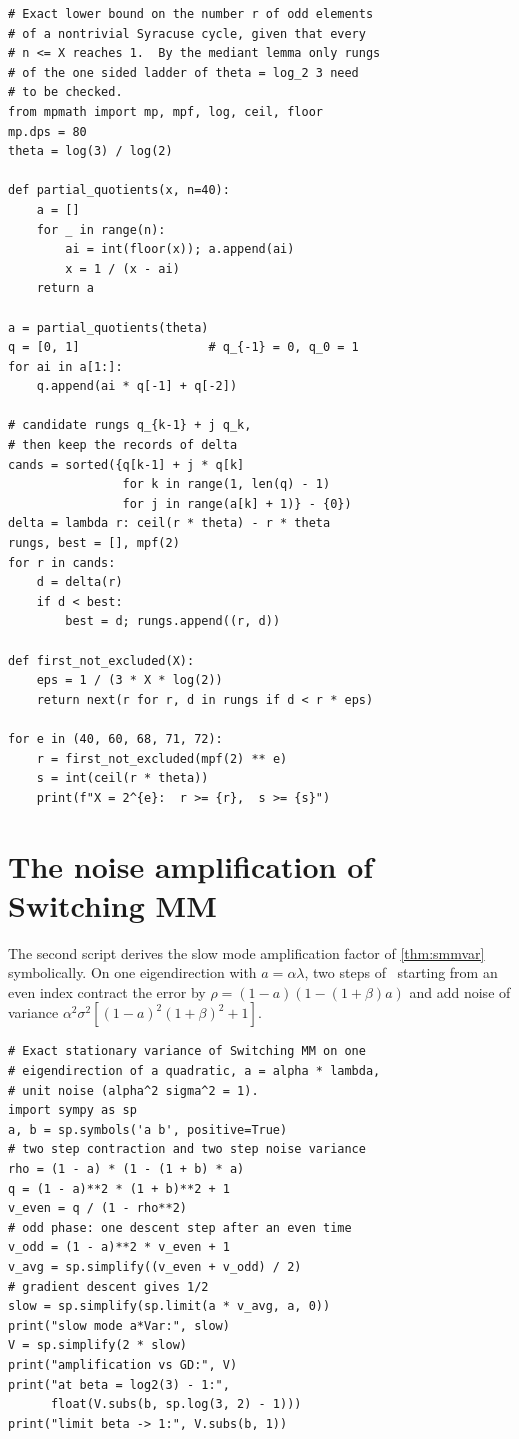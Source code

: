 \begin{lstlisting}
# Exact lower bound on the number r of odd elements
# of a nontrivial Syracuse cycle, given that every
# n <= X reaches 1.  By the mediant lemma only rungs
# of the one sided ladder of theta = log_2 3 need
# to be checked.
from mpmath import mp, mpf, log, ceil, floor
mp.dps = 80
theta = log(3) / log(2)

def partial_quotients(x, n=40):
    a = []
    for _ in range(n):
        ai = int(floor(x)); a.append(ai)
        x = 1 / (x - ai)
    return a

a = partial_quotients(theta)
q = [0, 1]                  # q_{-1} = 0, q_0 = 1
for ai in a[1:]:
    q.append(ai * q[-1] + q[-2])

# candidate rungs q_{k-1} + j q_k,
# then keep the records of delta
cands = sorted({q[k-1] + j * q[k]
                for k in range(1, len(q) - 1)
                for j in range(a[k] + 1)} - {0})
delta = lambda r: ceil(r * theta) - r * theta
rungs, best = [], mpf(2)
for r in cands:
    d = delta(r)
    if d < best:
        best = d; rungs.append((r, d))

def first_not_excluded(X):
    eps = 1 / (3 * X * log(2))
    return next(r for r, d in rungs if d < r * eps)

for e in (40, 60, 68, 71, 72):
    r = first_not_excluded(mpf(2) ** e)
    s = int(ceil(r * theta))
    print(f"X = 2^{e}:  r >= {r},  s >= {s}")
\end{lstlisting}

\section{The noise amplification of Switching MM}

The second script derives the slow mode amplification factor of
\cref{thm:smmvar} symbolically. On one eigendirection with $a=\alpha\lambda$,
two steps of \smmdet\ starting from an even index contract the error by
$\rho=(1-a)(1-(1+\beta)a)$ and add noise of variance
$\alpha^2\sigma^2[(1-a)^2(1+\beta)^2+1]$.

\begin{lstlisting}
# Exact stationary variance of Switching MM on one
# eigendirection of a quadratic, a = alpha * lambda,
# unit noise (alpha^2 sigma^2 = 1).
import sympy as sp
a, b = sp.symbols('a b', positive=True)
# two step contraction and two step noise variance
rho = (1 - a) * (1 - (1 + b) * a)
q = (1 - a)**2 * (1 + b)**2 + 1
v_even = q / (1 - rho**2)
# odd phase: one descent step after an even time
v_odd = (1 - a)**2 * v_even + 1
v_avg = sp.simplify((v_even + v_odd) / 2)
# gradient descent gives 1/2
slow = sp.simplify(sp.limit(a * v_avg, a, 0))
print("slow mode a*Var:", slow)
V = sp.simplify(2 * slow)
print("amplification vs GD:", V)
print("at beta = log2(3) - 1:",
      float(V.subs(b, sp.log(3, 2) - 1)))
print("limit beta -> 1:", V.subs(b, 1))
\end{lstlisting}


